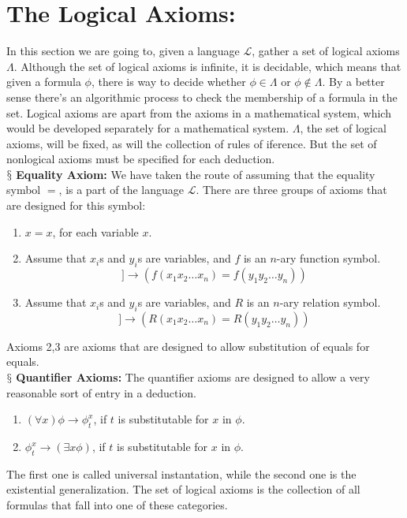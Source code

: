 \documentclass[9pt,a4paper]{article}
\newcommand{\newpoint}[1]{\ \\ \indent$\mathsection$ \textbf{#1}}
\newcommand{\curveL}{\mathcal{L}}
\begin{document}
    \section*{The Logical Axioms:}
        In this section we are going to, given a language $\curveL$, gather a set of logical axioms $\Lambda$. Although the set of logical axioms is infinite, it is decidable, which means that given a formula $\phi$, there is way to decide whether $\phi \in \Lambda$ or $\phi \not\in \Lambda$. By a better sense there's an algorithmic process to check the membership of a formula in the set. Logical axioms are apart from the axioms in a mathematical system, which would be developed separately for a mathematical system. $\Lambda$, the set of logical axioms, will be fixed, as will the collection of rules of iference. But the set of nonlogical axioms must be specified for each deduction. 
        \newpoint{Equality Axiom:} We have taken the route of assuming that the equality symbol $=$, is a part of the language $\curveL$. There are three groups of axioms that are designed for this symbol:
        \begin{enumerate}
            \item $x=x$, for each variable $x$. 
            \item Assume that $x_i$s and $y_i$s are variables, and $f$ is an $n$-ary function symbol. 
            \begin{equation}
                [(x_1=y_1)\land (x_2=y_2)\land \dots\land (x_n=y_n]]\rightarrow (f(x_1x_2\dots x_n) = f(y_1y_2\dots y_n))
            \end{equation}
            \item Assume that $x_i$s and $y_i$s are variables, and $R$ is an $n$-ary relation symbol. 
            \begin{equation}
                [(x_1=y_1)\land (x_2=y_2)\land \dots\land (x_n=y_n]]\rightarrow (R(x_1x_2\dots x_n) = R(y_1y_2\dots y_n))
            \end{equation}
        \end{enumerate}
        Axioms 2,3 are axioms that are designed to allow substitution of equals for equals.
        \newpoint{Quantifier Axioms:} The quantifier axioms are designed to allow a very reasonable sort of entry in a deduction. 
        \begin{enumerate}
            \item $(\forall x)\phi \rightarrow \phi_t^x$, if $t$ is substitutable for $x$ in $\phi$.
            \item $\phi_t^x \rightarrow (\exists x\phi)$, if $t$ is substitutable for $x$ in $\phi$.
        \end{enumerate}
        The first one is called universal instantation, while the second one is the existential generalization. The set of logical axioms is the collection of all formulas that fall into one of these categories.
\end{document}
